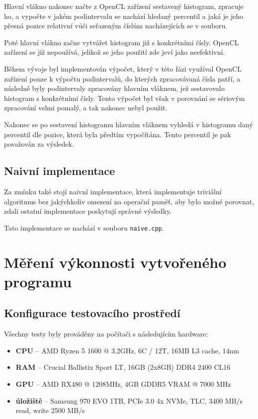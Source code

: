 \documentclass[12pt, a4paper]{article}
\let\oldsection\section
\renewcommand\section{\clearpage\oldsection}
\begin{document}
Hlavní vlákno nakonec načte z OpenCL zařízení sestavený histogram, zpracuje ho, a vypočte v jakém podintervalu se nachází hledaný percentil a jaká je jeho přesná pozice relativní vůči seřazeným číslům nacházejících se v souboru.

Poté hlavní vlákno začne vytvářet histogram již s konkrétními čísly. OpenCL zařízení se již nepoužívá, jelikož se jeho použití zde jeví jako neefektivní.

Během vývoje byl implementován výpočet, který v této fázi využíval OpenCL zařízení pouze k výpočtu podintervalů, do kterých zpracovávaná čísla patří, a následně byly podintervaly zpracovány hlavním vláknem, jež sestavovalo histogram s konkrétními čísly.
Tento výpočet byl však v porovnání se sériovým zpracování velmi pomalý, a tak nakonec nebyl použit.

Nakonec se po sestavení histogramu hlavním vláknem vyhledá v histogramu daný percentil dle pozice, která byla předtím vypočítána.
Tento percentil je pak považován za výsledek.

\subsection{Naivní implementace}
Za zmínku také stojí naivní implementace, která implementuje triviální algoritmus bez jakýchkoliv omezení na operační paměť, aby bylo možné porovnat, zdali ostatní implementace poskytují správné výsledky.

Tato implementace se nachází v souboru \texttt{naive.cpp}.

\section{Měření výkonnosti vytvořeného programu}

\subsection{Konfigurace testovacího prostředí}
Všechny testy byly prováděny na počítači s následujícím hardware:

\begin{itemize}
    \item \textbf{CPU} -- AMD Ryzen 5 1600 @ 3.2GHz, 6C / 12T, 16MB L3 cache, 14nm 
    \item \textbf{RAM} -- Crucial Ballistix Sport LT, 16GB (2x8GB) DDR4 2400 CL16
    \item \textbf{GPU} -- AMD RX480 @ 1208MHz, 4GB GDDR5 VRAM @ 7000 MHz
    \item \textbf{úložiště} -- Samsung 970 EVO 1TB, PCIe 3.0 4x NVMe, TLC, 3400 MB/s read, write 2500 MB/s
\end{itemize}
\end{document}
